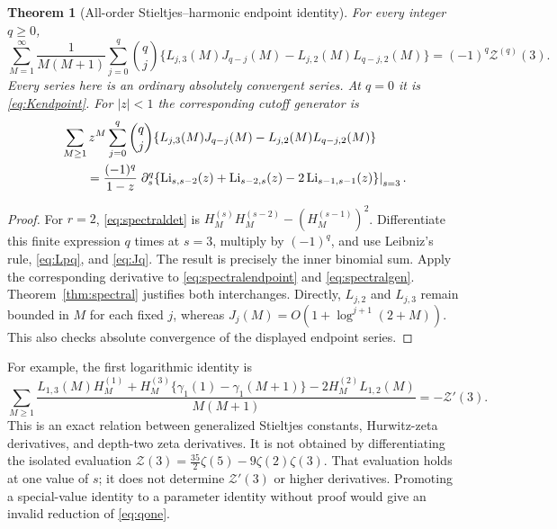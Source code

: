 \documentclass[11pt,letterpaper]{article}
\numberwithin{equation}{section}
\newtheorem{theorem}{Theorem}[section]
\theoremstyle{definition}\newtheorem{definition}[theorem]{Definition}
\theoremstyle{remark}\newtheorem{remark}[theorem]{Remark}
\begin{document}
\begin{theorem}[All-order Stieltjes--harmonic endpoint identity]
\label{thm:stieltjes}
For every integer $q\ge0$,
\begin{equation}\label{eq:allstieltjes}
 \boxed{\displaystyle
 \sum_{M=1}^{\infty}\frac1{M(M+1)}
    \sum_{j=0}^q\binom qj
       \bigl\{L_{j,3}(M)J_{q-j}(M)
                   -L_{j,2}(M)L_{q-j,2}(M)\bigr\}
                   =(-1)^q\mathcal Z^{(q)}(3).}
\end{equation}
Every series here is an ordinary absolutely convergent series. At
$q=0$ it is \eqref{eq:Kendpoint}. For $|z|<1$ the corresponding
cutoff generator is
\begin{equation}\label{eq:stieltjesgen}
 \begin{split}
 &\sum_{M\ge1}z^M\sum_{j=0}^q\binom qj
       \{L_{j,3}(M)J_{q-j}(M)-L_{j,2}(M)L_{q-j,2}(M)\}\\
 &\qquad=
 \frac{(-1)^q}{1-z}
 \left.\partial_s^q
  \{\operatorname{Li}_{s,s-2}(z)+\operatorname{Li}_{s-2,s}(z)-2\operatorname{Li}_{s-1,s-1}(z)\}
                                                      \right|_{s=3}.
 \end{split}
\end{equation}
\end{theorem}
\begin{proof}
For $r=2$, \eqref{eq:spectraldet} is
$H_M^{(s)}H_M^{(s-2)}-(H_M^{(s-1)})^2$.
Differentiate this finite expression $q$ times at $s=3$, multiply by
$(-1)^q$, and use Leibniz's rule, \eqref{eq:Lpq}, and \eqref{eq:Jq}.
The result is precisely the inner binomial sum. Apply the corresponding
derivative to \eqref{eq:spectralendpoint} and
\eqref{eq:spectralgen}. Theorem~\ref{thm:spectral} justifies both
interchanges. Directly, $L_{j,2}$ and $L_{j,3}$ remain bounded in $M$
for each fixed $j$, whereas $J_j(M)=O(1+\log^{j+1}(2+M))$. This also
checks absolute convergence of the displayed endpoint series.
\end{proof}

For example, the first logarithmic identity is
\begin{equation}\label{eq:qone}
 \sum_{M\ge1}\frac{
    L_{1,3}(M)H_M^{(1)}+H_M^{(3)}\{\gamma_1(1)-\gamma_1(M+1)\}
          -2H_M^{(2)}L_{1,2}(M)}{M(M+1)}=-\mathcal Z'(3).
\end{equation}
This is an exact relation between generalized Stieltjes constants,
Hurwitz-zeta derivatives, and depth-two zeta derivatives. It is not
obtained by differentiating the isolated evaluation
$\mathcal Z(3)=\tfrac{35}2\zeta(5)-9\zeta(2)\zeta(3)$.
That evaluation holds at one value of $s$; it does not determine
$\mathcal Z'(3)$ or higher derivatives. Promoting a special-value
identity to a parameter identity without proof would give an invalid
reduction of \eqref{eq:qone}.
\end{document}
